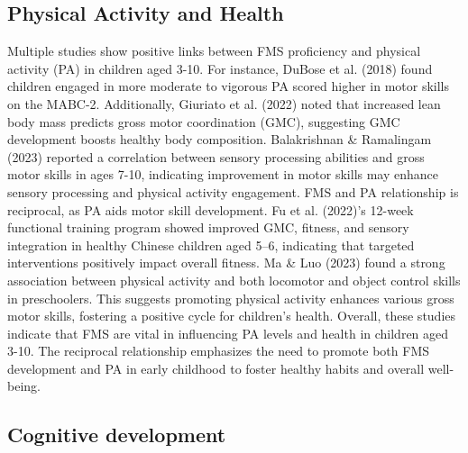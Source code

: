 \documentclass[
  letterpaper,
  DIV=11,
  numbers=noendperiod]{scrreprt}
\begin{document}
\subsection{Physical Activity and
Health}\label{physical-activity-and-health}

Multiple studies show positive links between FMS proficiency and
physical activity (PA) in children aged 3-10. For instance, DuBose et
al. (2018) found children engaged in more moderate to vigorous PA scored
higher in motor skills on the MABC-2. Additionally, Giuriato et al.
(2022) noted that increased lean body mass predicts gross motor
coordination (GMC), suggesting GMC development boosts healthy body
composition. Balakrishnan \& Ramalingam (2023) reported a correlation
between sensory processing abilities and gross motor skills in ages
7-10, indicating improvement in motor skills may enhance sensory
processing and physical activity engagement. FMS and PA relationship is
reciprocal, as PA aids motor skill development. Fu et al. (2022)'s
12-week functional training program showed improved GMC, fitness, and
sensory integration in healthy Chinese children aged 5--6, indicating
that targeted interventions positively impact overall fitness. Ma \& Luo
(2023) found a strong association between physical activity and both
locomotor and object control skills in preschoolers. This suggests
promoting physical activity enhances various gross motor skills,
fostering a positive cycle for children's health. Overall, these studies
indicate that FMS are vital in influencing PA levels and health in
children aged 3-10. The reciprocal relationship emphasizes the need to
promote both FMS development and PA in early childhood to foster healthy
habits and overall well-being.

\subsection{Cognitive development}\label{cognitive-development}
\end{document}
